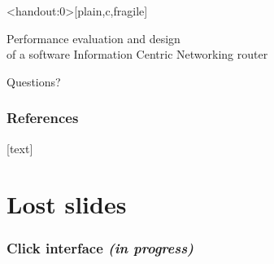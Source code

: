 \begingroup
{}
\begin{frame}<handout:0>[plain,c,fragile]
  \begin{center}
    {\normalsize Performance evaluation and design \\[-6pt]
     of a software Information Centric Networking router}

    \vspace{1em}

    Questions?
  \end{center}
\end{frame}
\endgroup

\extraslidesbegin

\begin{frame}[allowframebreaks]
  \frametitle{References}

  [text]
  
  
\end{frame}


\section*{Lost slides}
\begin{frame}[fragile]
  \frametitle{Click interface \textit{(in progress)}}
  
\end{frame}

\extraslidesend



              
